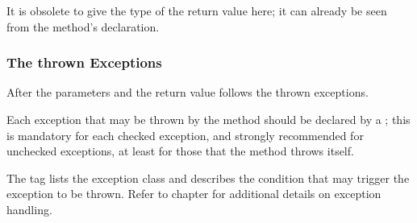 It is obsolete to give the type of the return value here; it can already be seen from the method's declaration.


\subsubsection{The thrown Exceptions}
After the parameters and the return value follows the thrown exceptions.

Each exception that may be thrown by the method should be declared by a  ; this is mandatory for each checked exception, and strongly recommended for unchecked exceptions, at least for those that the method throws itself. 

The  tag lists the exception class and describes the condition that may trigger the exception to be thrown. Refer to chapter  for additional details on exception handling.


